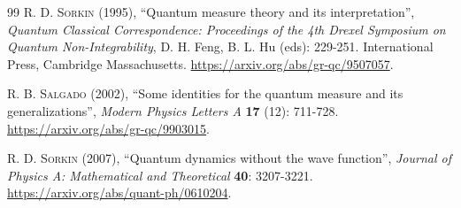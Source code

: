 \documentclass{article}
\begin{document}
\begin{thebibliography}{99}
\textsc{R. D. Sorkin} (1995), ``Quantum measure theory and its interpretation'', \textit{Quantum Classical Correspondence: Proceedings of the 4th Drexel Symposium on Quantum Non-Integrability}, D. H. Feng, B. L. Hu (eds): 229-251. International Press, Cambridge Massachusetts. \url{https://arxiv.org/abs/gr-qc/9507057}.

\textsc{R. B. Salgado} (2002), ``Some identities for the quantum measure and its generalizations'', \textit{Modern Physics Letters A} \textbf{17} (12): 711-728. \url{https://arxiv.org/abs/gr-qc/9903015}.

\textsc{R. D. Sorkin} (2007), ``Quantum dynamics without the wave function'', \textit{Journal of Physics A: Mathematical and Theoretical} \textbf{40}: 3207-3221. \url{https://arxiv.org/abs/quant-ph/0610204}.
\end{thebibliography}
\end{document}

